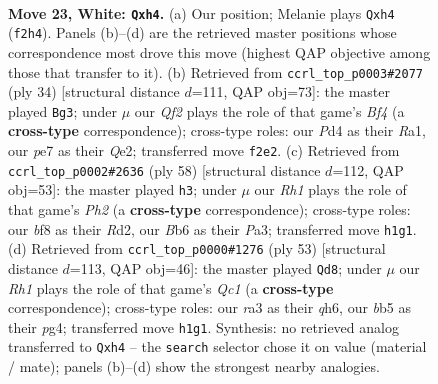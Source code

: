 \documentclass[11pt]{article}
\begin{document}
\clearpage

\begin{figure}[p]\centering
\begin{subfigure}{0.46\textwidth}\centering
\resizebox{\linewidth}{!}{%
\newchessgame
\chessboard[
  setfen={2k2b1r/1p2pp1n/1B1p2p1/1b6/3PP2p/rP2RP2/P4QPP/2K4R w - - 4 23},
  showmover=false,
  pgfstyle=straightmove, color=movearrow, markmove={f2-h4}
]}
\caption{}
\end{subfigure}\hfill
\begin{subfigure}{0.46\textwidth}\centering
\resizebox{\linewidth}{!}{%
\newchessgame
\chessboard[
  setfen={r3kbr1/1pp1n2p/p4p2/2p5/2N1PB2/5P1q/PP2QP1P/R2R3K w q - 5 18},
  showmover=false,
  pgfstyle=straightmove, color=movearrow, markmove={f4-g3}
]}
\caption{}
\end{subfigure}
\\[4pt]
\begin{subfigure}{0.46\textwidth}\centering
\resizebox{\linewidth}{!}{%
\newchessgame
\chessboard[
  setfen={2r5/3r1p1k/1q2pbpp/8/p2P1P2/P1BRPQ2/1P1R3P/7K w - - 4 30},
  showmover=false,
  pgfstyle=straightmove, color=movearrow, markmove={h2-h3}
]}
\caption{}
\end{subfigure}\hfill
\begin{subfigure}{0.46\textwidth}\centering
\resizebox{\linewidth}{!}{%
\newchessgame
\chessboard[
  setfen={2q3k1/2p2p2/pp2r1pQ/3p4/PP1Pb1P1/2P4P/1R3P2/5BK1 b - - 0 27},
  showmover=false,
  pgfstyle=straightmove, color=movearrow, markmove={c8-d8}
]}
\caption{}
\end{subfigure}
\caption{\textbf{Move 23, White: \texttt{Qxh4}.} (a) Our position; Melanie plays \texttt{Qxh4} (\texttt{f2h4}). Panels (b)--(d) are the retrieved master positions whose correspondence most drove this move (highest QAP objective among those that transfer to it). (b) Retrieved from \texttt{ccrl\_top\_p0003\#2077} (ply 34) [structural distance $d$=111, QAP obj=73]: the master played \texttt{Bg3}; under $\mu$ our \emph{Qf2} plays the role of that game's \emph{Bf4} (a \textbf{cross-type} correspondence); cross-type roles: our \emph{P}d4 as their \emph{R}a1, our \emph{p}e7 as their \emph{Q}e2; transferred move \texttt{f2e2}. (c) Retrieved from \texttt{ccrl\_top\_p0002\#2636} (ply 58) [structural distance $d$=112, QAP obj=53]: the master played \texttt{h3}; under $\mu$ our \emph{Rh1} plays the role of that game's \emph{Ph2} (a \textbf{cross-type} correspondence); cross-type roles: our \emph{b}f8 as their \emph{R}d2, our \emph{B}b6 as their \emph{P}a3; transferred move \texttt{h1g1}. (d) Retrieved from \texttt{ccrl\_top\_p0000\#1276} (ply 53) [structural distance $d$=113, QAP obj=46]: the master played \texttt{Qd8}; under $\mu$ our \emph{Rh1} plays the role of that game's \emph{Qc1} (a \textbf{cross-type} correspondence); cross-type roles: our \emph{r}a3 as their \emph{q}h6, our \emph{b}b5 as their \emph{p}g4; transferred move \texttt{h1g1}. Synthesis: no retrieved analog transferred to \texttt{Qxh4} -- the \texttt{search} selector chose it on value (material / mate); panels (b)--(d) show the strongest nearby analogies.}
\label{fig:thought-m44}
\end{figure}
\end{document}
